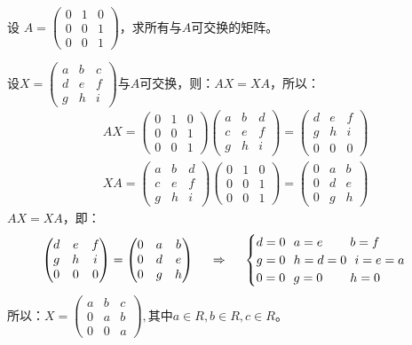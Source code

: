 \documentclass[a4paper]{report}
\begin{document}
\EX 设
$
A=
\begin{pmatrix}
0&1&0\\ 0&0&1\\ 0&0&1
\end{pmatrix}
$，求所有与$A$可交换的矩阵。

\begin{jie}
设$X=
\begin{pmatrix}
a&b&c\\ d&e&f\\ g&h&i
\end{pmatrix}
$与$A$可交换，则：$AX=XA$，所以：
\begin{align*}
&AX=
\begin{pmatrix}
0&1&0\\ 0&0&1\\ 0&0&1
\end{pmatrix}\begin{pmatrix}
a&b&d\\ c&e&f\\ g&h&i
\end{pmatrix}=\begin{pmatrix}
d&e&f\\ g&h&i\\ 0&0&0
\end{pmatrix}\\
&XA=\begin{pmatrix}
a&b&d\\ c&e&f\\ g&h&i
\end{pmatrix}\begin{pmatrix}
0&1&0\\ 0&0&1\\ 0&0&1
\end{pmatrix}=\begin{pmatrix}
0&a&b\\ 0&d&e\\ 0&g&h
\end{pmatrix}
\end{align*}
$AX=XA$，即：
\begin{equation*}
\begin{pmatrix}
d&e&f\\ g&h&i\\ 0&0&0
\end{pmatrix}=\begin{pmatrix}
0&a&b\\ 0&d&e\\ 0&g&h
\end{pmatrix}~~~~\Rightarrow~~~~
\begin{cases}
d=0~~a=e\hphantom{=0}~~b=f\\
g=0~~h=d=0~~i=e=a\\
0=0~~g=0\hphantom{=0}~~h=0
\end{cases}
\end{equation*}
所以：$X=
\begin{pmatrix}
a&b&c\\ 0&a&b\\ 0&0&a
\end{pmatrix},\text{其中}a\in R,b\in R,c\in R
$。
\end{jie}
\end{document}
